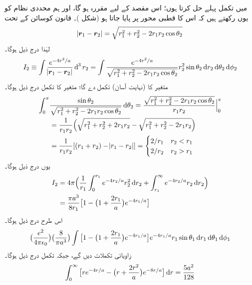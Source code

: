 میں  تکمل پہلے حل کرتا ہوں؛ اس مقصد کے لیے  مقررہ ہو گا، اور ہم  محددی نظام کو یوں رکھتے ہیں کہ اس کا قطبی محور  پر پایا جاتا ہو (شکل )۔ قانون کوسائن کے تحت 
\begin{align}
\abs{{{\boldsymbol{r}}}_{1}-{{\boldsymbol{r}}}_{2}}=\sqrt{r_{1}^{2}+r_{2}^{2}-2r_{1}r_{2}\cos{\theta_{2}}} 
\end{align}
 لہٰذا درج ذیل ہوگا۔
\begin{align}
I_{2}\equiv\int\frac{e^{-4r^{2}/a}}{\abs{\kvec{r}_{1}-\kvec{r}_{2}}}\dif^{\,3}r_{2}=\int\frac{e^{-4r^{2}/a}}{\sqrt{r_{1}^{2}+r_{2}^{2}-2r_{1}r_{2}\cos{\theta_{2}}}}r_{2}^{2}\sin{\theta_{2}}\dif r_{2}\dif \theta_{2}\dif \phi_{2} 
\end{align}
 متغیر  کا (نہایت آسان) تکمل  دے گا؛ متغیر  کا تکمل درج ذیل ہوگا۔
\begin{align}
 \int_{0}^{\pi}&\frac{\sin{\theta_{2}}}{\sqrt{r_{1}^{2}+r_{2}^{2}-2r_{1}r_{2}\cos{\theta_{2}}}}\dif{\theta_{2}}=\frac{\sqrt{r_{1}^{2}+r_{2}^{2}-2r_{1}r_{2}\cos{\theta_{2}}}}{r_{1}r_{2}}\Big\vert_{0}^{\pi}\nonumber\\
 &=\frac{1}{r_{1}r_{2}}\Big(\sqrt{r_{1}^{2}+r_{2}^{2}+2r_{1}r_{2}}-\sqrt{r_{1}^{2}+r_{2}^{2}-2r_{1}r_{2}}\Big)\nonumber\\
&=\frac{1}{r_{1}r_{2}}[(r_{1}+r_{2})-\abs{r_{1}-r_{2}}]=\begin{cases} 2/r_{1} & r_{2}<r_{1}\\
2/r_{2}&r_{2}>r_{1}
\end{cases}
\end{align}
 یوں درج ذیل ہوگا۔
\begin{align} 
I_{2}&=4\pi\Big (\frac{1}{r_{1}}\int_{0}^{r_{1}}e^{-4r_{2}/a}r_{2}^{2}\dif r_{2}+\int_{r_{1}}^{\infty}e^{-4r_{2}/a}r_{2}\dif r_{2}\Big)\nonumber\\
&=\frac{\pi a^{3}}{8r_{1}}\big[1-\big(1+\frac{2r_{1}}{a}\big)e^{-4r_{1}/a}\big]
\end{align}
 اس طرح  درج ذیل ہوگا۔
\begin{align*}
\big(\frac{e^{2}}{4\pi\epsilon_{0}}\big)\big(\frac{8}{\pi a^{3}}\big )\int\big [1-\big (1+\frac{2r_{1}}{a}\big )e^{-4r_{1}/a}\big ]e^{-4r_{1}/a}r_{1}\sin{\theta_{1}}\dif r_{1}\dif \theta_{1}\dif \phi_{1} 
\end{align*}
 زاویائی تکملات  دیں گے، جبکہ  تکمل درج ذیل ہوگا۔
\begin{align*}
\int_{0}^{\infty}\big [re^{-4r/a}-\big (r+\frac{2r^{2}}{a}\big )e^{-8r/a}\big ]\dif r=\frac{5a^{2}}{128} 
\end{align*}
